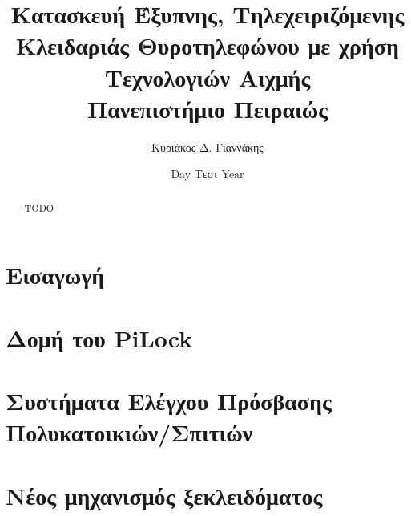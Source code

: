 \documentclass[12pt]{report}
\title{
    {Κατασκευή Έξυπνης, Τηλεχειριζόμενης Κλειδαριάς Θυροτηλεφώνου με χρήση Τεχνολογιών Αιχμής }\\
    {\large Πανεπιστήμιο Πειραιώς}
}
\author{Κυριάκος Δ. Γιαννάκης}
\date{Day Τεστ Year}
\begin{document}
    \maketitle
    
    \begin{abstract}
        TODO
    \end{abstract}
    
    \tableofcontents
    
    \chapter{Εισαγωγή}
    

    \chapter{Δομή του PiLock}
    

    \chapter{Συστήματα Ελέγχου Πρόσβασης Πολυκατοικιών/Σπιτιών}
    

    \chapter{Νέος μηχανισμός ξεκλειδόματος}
    

    
    
\end{document}

